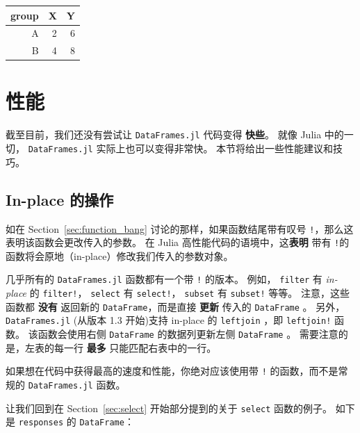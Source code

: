 \documentclass[
  notoc %
]{tufte-book}
\newcommand{\passthrough}[1]{#1}
\begin{document}
\begin{longtable}[]{@{}rrr@{}}
\toprule
group & X & Y \\
\midrule
\endhead
A & 2 & 6 \\
B & 4 & 8 \\
\bottomrule
\end{longtable}

\hypertarget{sec:df_performance}{%
\section{性能}\label{sec:df_performance}}

截至目前，我们还没有尝试让 \passthrough{\lstinline!DataFrames.jl!}
代码变得 \textbf{快些}。 就像 Julia 中的一切，
\passthrough{\lstinline!DataFrames.jl!} 实际上也可以变得非常快。
本节将给出一些性能建议和技巧。

\hypertarget{sec:df_performance_inplace}{%
\subsection{In-place 的操作}\label{sec:df_performance_inplace}}

如在 Section~\ref{sec:function_bang} 讨论的那样，如果函数结尾带有叹号
\passthrough{\lstinline"!"}，那么这表明该函数会更改传入的参数。 在 Julia
高性能代码的语境中，这\textbf{表明} 带有
\passthrough{\lstinline"!"}的函数将会原地（in-place）修改我们传入的参数对象。

几乎所有的 \passthrough{\lstinline!DataFrames.jl!} 函数都有一个带
\passthrough{\lstinline"!"} 的版本。 例如，
\passthrough{\lstinline!filter!} 有 \emph{in-place} 的
\passthrough{\lstinline"filter!"}， \passthrough{\lstinline!select!} 有
\passthrough{\lstinline"select!"}， \passthrough{\lstinline!subset!} 有
\passthrough{\lstinline"subset!"} 等等。 注意，这些函数都 \textbf{没有}
返回新的 \passthrough{\lstinline!DataFrame!}，而是直接 \textbf{更新}
传入的 \passthrough{\lstinline!DataFrame!} 。 另外，
\passthrough{\lstinline!DataFrames.jl!} (从版本 1.3 开始)支持 in-place
的 \passthrough{\lstinline!leftjoin!} ，即
\passthrough{\lstinline"leftjoin!"} 函数。 该函数会使用右侧
\passthrough{\lstinline!DataFrame!} 的数据列更新左侧
\passthrough{\lstinline!DataFrame!} 。 需要注意的是，左表的每一行
\textbf{最多} 只能匹配右表中的一行。

如果想在代码中获得最高的速度和性能，你绝对应该使用带
\passthrough{\lstinline"!"} 的函数，而不是常规的
\passthrough{\lstinline!DataFrames.jl!} 函数。

让我们回到在 Section~\ref{sec:select} 开始部分提到的关于
\passthrough{\lstinline!select!} 函数的例子。 如下是
\passthrough{\lstinline!responses!} 的
\passthrough{\lstinline!DataFrame!}：
\end{document}
